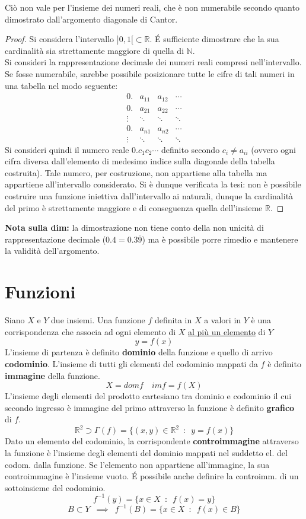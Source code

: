 \documentclass[10pt, oneside]{book}
\theoremstyle{plain}
\begin{document}
Ciò non vale per l'insieme dei numeri reali, che è non numerabile secondo quanto dimostrato dall'argomento diagonale di Cantor.
\begin{proof}
    Si considera l'intervallo $]0,1[ \subset \mathbb{R}$. \'E sufficiente dimostrare che la sua cardinalità sia strettamente maggiore di quella di $\mathbb{N}$.
    \\Si consideri la rappresentazione decimale dei numeri reali compresi nell'intervallo. Se fosse numerabile, sarebbe possibile posizionare tutte le cifre di tali numeri in una tabella nel modo seguente:
    \[\begin{matrix}
    0. & a_{11} & a_{12} & \cdots \\
    0. & a_{21} & a_{22} & \cdots \\
    \vdots & \ddots & \ddots & \ddots \\
    0. & a_{n1} & a_{n2} & \cdots \\
    \vdots & \ddots & \ddots & \ddots
    \end{matrix}\]
    Si consideri quindi il numero reale $0.c_1 c_2 \cdots$ definito secondo $c_i \neq a_{ii}$ (ovvero ogni cifra diversa dall'elemento di medesimo indice sulla diagonale della tabella costruita). Tale numero, per costruzione, non appartiene alla tabella ma appartiene all'intervallo considerato. Si è dunque verificata la tesi: non è possibile costruire una funzione iniettiva dall'intervallo ai naturali, dunque la cardinalità del primo è strettamente maggiore e di conseguenza quella dell'insieme $\mathbb{R}$.
\end{proof}
\textbf{Nota sulla dim: } la dimostrazione non tiene conto della non unicità di rappresentazione decimale ($0.4 = 0.3\overline{9}$) ma è possibile porre rimedio e mantenere la validità dell'argomento.


\chapter{Funzioni}
\begin{defin}
Siano $X$ e $Y$ due insiemi. Una funzione $f$ definita in $X$ a valori in $Y$ è una corrispondenza che associa ad ogni elemento di $X$ \underline{al più un elemento} di $Y$
\[y = f(x)\]
L'insieme di partenza è definito \textbf{dominio} della funzione e quello di arrivo \textbf{codominio}. L'insieme di tutti gli elementi del codominio mappati da $f$ è definito \textbf{immagine} della funzione.
\[X = dom f \quad im f = f(X)\]
L'insieme degli elementi del prodotto cartesiano tra dominio e codominio il cui secondo ingresso è immagine del primo attraverso la funzione è definito \textbf{grafico} di $f$.
\[\mathbb{R}^2 \supset \Gamma (f) = \{(x,y) \in \mathbb{R}^2 \enspace : \enspace y = f(x) \}\]
Dato un elemento del codominio, la corrispondente \textbf{controimmagine} attraverso la funzione è l'insieme degli elementi del dominio mappati nel suddetto el. del codom. dalla funzione. Se l'elemento non appartiene all'immagine, la sua controimmagine è l'insieme vuoto. \'E possibile anche definire la controimm. di un sottoinsieme del codominio.
\[f^{-1}(y) = \{x \in X \enspace : \enspace f(x) = y\}\] \[B \subset Y \enspace \implies \enspace f^{-1}(B) = \{x \in X \enspace : \enspace f(x) \in B\}\]
\end{defin}
\end{document}
